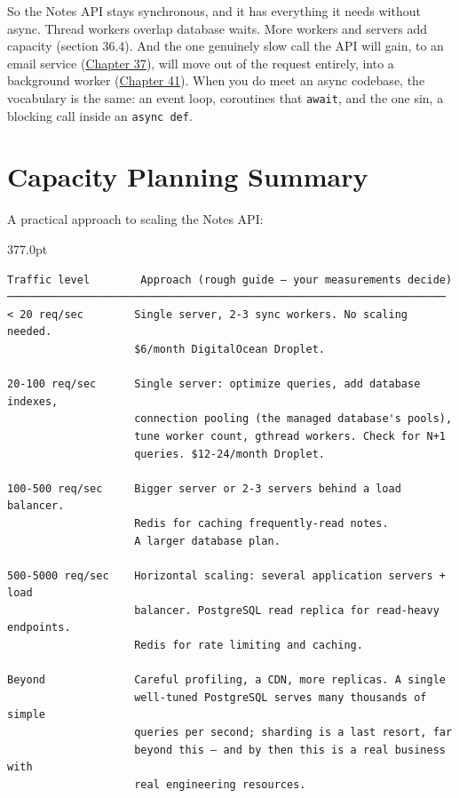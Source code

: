 So the Notes API stays synchronous, and it has everything it needs without async. Thread workers overlap database waits. More workers and servers add capacity (section 36.4). And the one genuinely slow call the API will gain, to an email service (\hyperref[ch:37-reliability]{Chapter 37}), will move out of the request entirely, into a background worker (\hyperref[ch:41-event-driven-architecture]{Chapter 41}). When you do meet an async codebase, the vocabulary is the same: an event loop, coroutines that \texttt{await}, and the one sin, a blocking call inside an \texttt{async\ def}.

\setcounter{section}{8}
\section{Capacity Planning Summary}\label{36-scaling-load:369-capacity-planning-summary}

A practical approach to scaling the Notes API:

\begin{diagrambox}[short]{377.0pt}
\begin{Verbatim}[fontsize=\fontsize{9.0}{8.55}\selectfont]
Traffic level        Approach (rough guide — your measurements decide)
─────────────────────────────────────────────────────────────────────
< 20 req/sec        Single server, 2-3 sync workers. No scaling needed.
                    $6/month DigitalOcean Droplet.

20-100 req/sec      Single server: optimize queries, add database indexes,
                    connection pooling (the managed database's pools),
                    tune worker count, gthread workers. Check for N+1
                    queries. $12-24/month Droplet.

100-500 req/sec     Bigger server or 2-3 servers behind a load balancer.
                    Redis for caching frequently-read notes.
                    A larger database plan.

500-5000 req/sec    Horizontal scaling: several application servers + load
                    balancer. PostgreSQL read replica for read-heavy endpoints.
                    Redis for rate limiting and caching.

Beyond              Careful profiling, a CDN, more replicas. A single
                    well-tuned PostgreSQL serves many thousands of simple
                    queries per second; sharding is a last resort, far
                    beyond this — and by then this is a real business with
                    real engineering resources.
\end{Verbatim}
\end{diagrambox}

